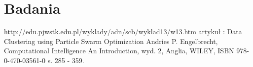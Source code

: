 \documentclass[twoside]{pracaMagisterskaMS}
\begin{document}
\section{Badania}


\begin{thebibliography}{12}

 http://edu.pjwstk.edu.pl/wyklady/adn/scb/wyklad13/w13.htm
 artykuł : Data Clustering using Particle Swarm Optimization
 Andries P. Engelbrecht, Computational Intelligence An Introduction, wyd. 2, Anglia, WILEY, ISBN 978-0-470-03561-0 s. 285 - 359.
\end{thebibliography}
\end{document}
